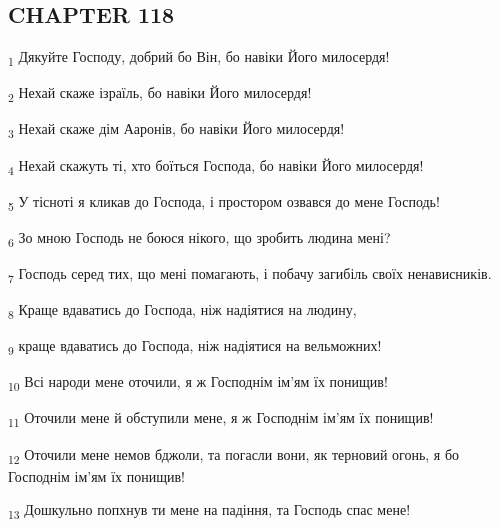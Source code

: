 \subsection{CHAPTER 118}
\begin{tcolorbox}
\textsubscript{1} Дякуйте Господу, добрий бо Він, бо навіки Його милосердя!
\end{tcolorbox}
\begin{tcolorbox}
\textsubscript{2} Нехай скаже ізраїль, бо навіки Його милосердя!
\end{tcolorbox}
\begin{tcolorbox}
\textsubscript{3} Нехай скаже дім Ааронів, бо навіки Його милосердя!
\end{tcolorbox}
\begin{tcolorbox}
\textsubscript{4} Нехай скажуть ті, хто боїться Господа, бо навіки Його милосердя!
\end{tcolorbox}
\begin{tcolorbox}
\textsubscript{5} У тісноті я кликав до Господа, і простором озвався до мене Господь!
\end{tcolorbox}
\begin{tcolorbox}
\textsubscript{6} Зо мною Господь не боюся нікого, що зробить людина мені?
\end{tcolorbox}
\begin{tcolorbox}
\textsubscript{7} Господь серед тих, що мені помагають, і побачу загибіль своїх ненависників.
\end{tcolorbox}
\begin{tcolorbox}
\textsubscript{8} Краще вдаватись до Господа, ніж надіятися на людину,
\end{tcolorbox}
\begin{tcolorbox}
\textsubscript{9} краще вдаватись до Господа, ніж надіятися на вельможних!
\end{tcolorbox}
\begin{tcolorbox}
\textsubscript{10} Всі народи мене оточили, я ж Господнім ім'ям їх понищив!
\end{tcolorbox}
\begin{tcolorbox}
\textsubscript{11} Оточили мене й обступили мене, я ж Господнім ім'ям їх понищив!
\end{tcolorbox}
\begin{tcolorbox}
\textsubscript{12} Оточили мене немов бджоли, та погасли вони, як терновий огонь, я бо Господнім ім'ям їх понищив!
\end{tcolorbox}
\begin{tcolorbox}
\textsubscript{13} Дошкульно попхнув ти мене на падіння, та Господь спас мене!
\end{tcolorbox}

